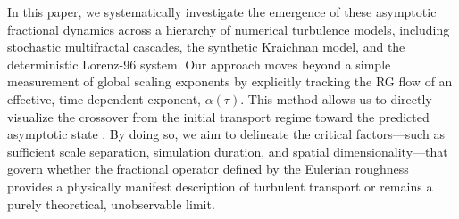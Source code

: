 \documentclass[]{article}
\begin{document}
In this paper, we systematically investigate the emergence of these asymptotic fractional dynamics \citep{edelman2022cyclesasymptoticallystablechaotic} across a hierarchy of numerical turbulence models, including stochastic multifractal cascades, the synthetic Kraichnan model, and the deterministic Lorenz-96 system. Our approach moves beyond a simple measurement of global scaling exponents by explicitly tracking the RG flow of an effective, time-dependent exponent, $\alpha(\tau)$. This method allows us to directly visualize the crossover from the initial transport regime toward the predicted asymptotic state \citep{majdoub2025longtimeasymptoticssubordinatedfractional}. By doing so, we aim to delineate the critical factors—such as sufficient scale separation, simulation duration, and spatial dimensionality—that govern whether the fractional operator defined by the Eulerian roughness provides a physically manifest description of turbulent transport or remains a purely theoretical, unobservable limit.
\end{document}
